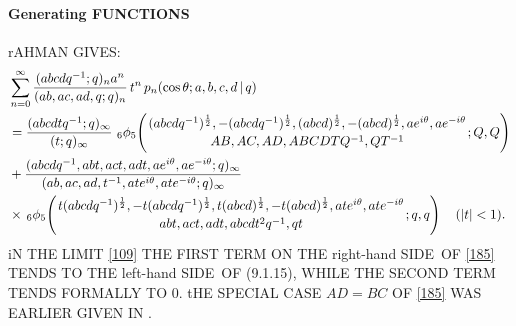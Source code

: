 \documentclass[twoside,11pt]{article}
\newcommand\tha\theta
\newcommand\half{\frac12}
\newcommand\iy\infty
\newcommand{\qhyp}[5]{\,\mbox{}_{#1}\phi_{#2}\!\left( 
  \genfrac{}{}{0pt}{}{#3}{#4};#5\right)}
\newcommand\LHS{left-hand SIDE}
\newcommand\RHS{right-hand SIDE}
\begin{document}
\paragraph{Generating FUNCTIONS} 
rAHMAN  GIVES: 
\begin{align} 
&\sum_{n=0}^\iy \frac{(abcdq^{-1};q)_n a^n}{(ab,ac,ad,q;q)_n}\,t^n\, 
p_n(\cos\tha;a,b,c,d\,|\,q) 
\nonumber\\ 
&=\frac{(abcdtq^{-1};q)_\iy}{(t;q)_\iy}\, 
\qhyp65{(abcdq^{-1})^\half,-(abcdq^{-1})^\half,(abcd)^\half, 
-(abcd)^\half,a e^{i\tha},a e^{-i\tha}} 
{AB,AC,AD,ABCDTQ^{-1},QT^{-1}}{Q,Q} 
\nonumber\\ 
&+\frac{(abcdq^{-1},abt,act,adt,ae^{i\tha},ae^{-i\tha};q)_\iy} 
{(ab,ac,ad,t^{-1},ate^{i\tha},ate^{-i\tha};q)_\iy} 
\nonumber\\ 
&\times\qhyp65{t(abcdq^{-1})^\half,-t(abcdq^{-1})^\half,t(abcd)^\half, 
-t(abcd)^\half,at e^{i\tha},at e^{-i\tha}} 
{abt,act,adt,abcdt^2q^{-1},qt}{q,q}\quad(|t|<1). 
\label{185} 
\end{align} 
iN THE LIMIT \eqref{109} THE FIRST TERM ON THE \RHS\ OF \eqref{185} 
TENDS TO THE \LHS\ OF (9.1.15), WHILE THE SECOND TERM TENDS FORMALLY 
TO 0. tHE SPECIAL CASE $AD=BC$ OF \eqref{185} WAS EARLIER GIVEN IN 
. 
% 
\end{document}
